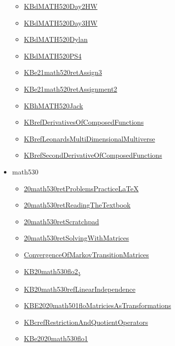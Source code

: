 \documentclass[11pt]{article}
\begin{document}
\begin{itemize}
\begin{itemize}
\item \href{math520/KBdMATH520Day2HW.org}{KBdMATH520Day2HW}
\item \href{math520/KBdMATH520Day3HW.org}{KBdMATH520Day3HW}
\item \href{math520/KBdMATH520Dylan.org}{KBdMATH520Dylan}
\item \href{math520/KBdMATH520PS4.org}{KBdMATH520PS4}
\item \href{math520/KBe21math520retAssign3.org}{KBe21math520retAssign3}
\item \href{math520/KBe21math520retAssignment2.org}{KBe21math520retAssignment2}
\item \href{math520/KBhMATH520Jack.org}{KBhMATH520Jack}
\item \href{math520/KBrefDerivativesOfComposedFunctions.org}{KBrefDerivativesOfComposedFunctions}
\item \href{math520/KBrefLeonardsMultiDimensionalMultiverse.org}{KBrefLeonardsMultiDimensionalMultiverse}
\item \href{math520/KBrefSecondDerivativeOfComposedFunctions.org}{KBrefSecondDerivativeOfComposedFunctions}
\end{itemize}
\item math530
\begin{itemize}
\item \href{math530/20math530retProblemsPracticeLaTeX.org}{20math530retProblemsPracticeLaTeX}
\item \href{math530/20math530retReadingTheTextbook.org}{20math530retReadingTheTextbook}
\item \href{math530/20math530retScratchpad.org}{20math530retScratchpad}
\item \href{math530/20math530retSolvingWithMatrices.org}{20math530retSolvingWithMatrices}
\item \href{math530/ConvergenceOfMarkovTransitionMatrices.org}{ConvergenceOfMarkovTransitionMatrices}
\item \href{math530/KB20math530flo2\_1.org}{KB20math530flo2\textsubscript{1}}
\item \href{math530/KB20math530refLinearIndependence.org}{KB20math530refLinearIndependence}
\item \href{math530/KBE2020math501floMatriciesAsTransformations.org}{KBE2020math501floMatriciesAsTransformations}
\item \href{math530/KBcrefRestrictionAndQuotientOperators.org}{KBcrefRestrictionAndQuotientOperators}
\item \href{math530/KBe2020math530flo1.org}{KBe2020math530flo1}

\end{itemize}
\end{itemize}
\end{document}
